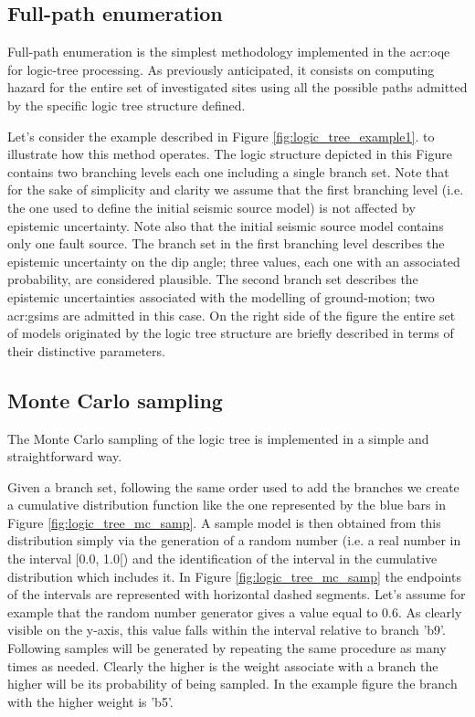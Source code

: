 \subsection{Full-path enumeration}
Full-path enumeration is the simplest methodology implemented in the
\gls{acr:oqe} for logic-tree processing. 
%
As previously anticipated, it consists on computing hazard 
for the entire set of investigated sites using all the possible paths 
admitted by the specific logic tree structure defined.

Let's consider the example described in Figure \ref{fig:logic_tree_example1}.
to illustrate how this method operates.
%
The logic structure depicted in this Figure contains two branching 
levels each one including a single branch set. 
%
Note that for the sake of simplicity and clarity we assume that the first 
branching level (i.e. the one used to define the initial seismic source 
model) is not affected by epistemic uncertainty. 
%
Note also that the initial seismic source model contains only one fault 
source.
%
The branch set in the first branching level describes the epistemic 
uncertainty on the dip angle; three values, each one with an associated 
probability, are considered plausible. 
%
The second branch set describes the epistemic uncertainties associated with 
the modelling of ground-motion; two \glspl{acr:gsim} are admitted in this
case. 
%
On the right side of the figure the entire set of models originated by the 
logic tree structure are briefly described in terms of their 
distinctive parameters.
\subsection{Monte Carlo sampling}
The Monte Carlo sampling of the logic tree is implemented in a simple and 
straightforward way. 

Given a branch set, following the same order used to add the branches 
we create a cumulative distribution function like the one represented 
by the blue bars in Figure \ref{fig:logic_tree_mc_samp}. 
%
A sample model is then obtained from this distribution simply via the 
generation of a random number (i.e. a real number in the interval 
[0.0, 1.0[) and the identification of the interval in the cumulative 
distribution which includes it. In Figure \ref{fig:logic_tree_mc_samp}
the endpoints of the intervals are represented with horizontal dashed
segments. Let's assume for example that the random number generator
gives a value equal to 0.6. As clearly visible on the y-axis,
this value falls within the interval relative to branch 'b9'. 
%
Following samples will be generated by repeating the same procedure as
many times as needed. Clearly the higher is the weight associate with 
a branch the higher will be its probability of being sampled. In the 
example figure the branch with the higher weight is 'b5'.

